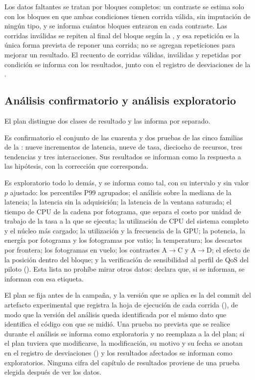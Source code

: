 Los datos faltantes se tratan por bloques completos: un contraste se estima
solo con los bloques en que ambas condiciones tienen corrida válida, sin
imputación de ningún tipo, y se informa cuántos bloques entraron en cada
contraste. Las corridas inválidas se repiten al final del bloque según la
, y esa repetición es la única forma prevista de
reponer una corrida; no se agregan repeticiones para mejorar un resultado. El
recuento de corridas válidas, inválidas y repetidas por condición se informa
con los resultados, junto con el registro de desviaciones de la
.

\subsection{Análisis confirmatorio y análisis exploratorio}
\label{sec:confirmatory}

El plan distingue dos clases de resultado y las informa por separado.

Es confirmatorio el conjunto de las cuarenta y dos pruebas de las cinco
familias de la : nueve incrementos de latencia,
nueve de tasa, dieciocho de recursos, tres tendencias y tres interacciones. Sus
resultados se informan como la respuesta a las hipótesis, con la corrección
que corresponda.

Es exploratorio todo lo demás, y se informa como tal, con su intervalo y sin
valor $p$ ajustado: los percentiles P99 agrupados; el análisis sobre la mediana
de la latencia; la latencia sin la adquisición; la latencia de la ventana
saturada; el tiempo de CPU de la cadena por fotograma, que separa el costo por
unidad de trabajo de la tasa a la que se ejecuta; la utilización de CPU del
sistema completo y el núcleo más cargado; la utilización y la
frecuencia de la GPU; la potencia, la energía por fotograma y los fotogramas
por vatio; la temperatura; los descartes por frontera; los fotogramas en
vuelo; los contrastes A$\to$C y A$\to$D; el efecto de la posición dentro del
bloque; y la verificación de sensibilidad al perfil de QoS del piloto
(). Esta lista no prohíbe mirar otros datos: declara
que, si se informan, se informan con esa etiqueta.

El plan se fija antes de la campaña, y la versión que se aplica es la del
commit del artefacto experimental que registra la hoja de ejecución de cada
corrida (), de modo que la versión del análisis queda
identificada por el mismo dato que identifica el código con que se midió. Una
prueba no prevista que se realice durante el análisis se informa como
exploratoria y no reemplaza a la del plan; si el plan tuviera que modificarse,
la modificación, su motivo y su fecha se anotan en el registro de desviaciones
() y los resultados afectados se informan como
exploratorios. Ninguna cifra del capítulo de resultados proviene de una prueba
elegida después de ver los datos.

